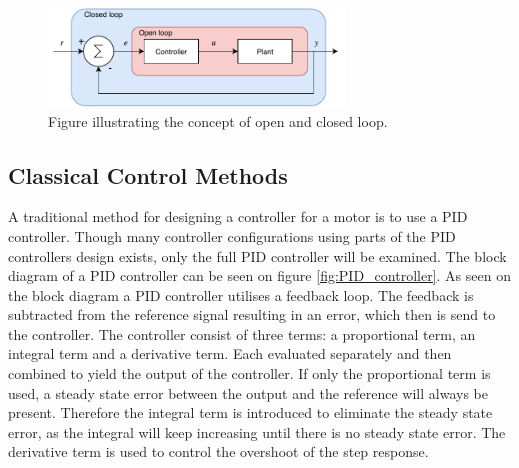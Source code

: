 \documentclass[../../main.tex]{subfiles}
\begin{document}

\begin{figure}[H]
    \centering
    \includegraphics[width=0.7\textwidth]{Sections/Miscellaneous/Images/Open_closed_Diagram.pdf}
    \caption{Figure illustrating the concept of open and closed loop. }
    \label{fig:Open_Close_loop}
\end{figure}





\subsection*{Classical Control Methods}


A traditional method for designing a controller for a motor is to use a PID controller. Though many controller configurations using parts of the PID controllers design exists, only the full PID controller will be examined. The block diagram of a PID controller can be seen on figure \ref{fig:PID_controller}. As seen on the block diagram
a PID controller utilises a feedback loop. The feedback is subtracted from the reference signal resulting in an error, which then is send to the controller. The controller consist of three terms: a proportional term, an integral term and a derivative term. Each evaluated separately and then combined to yield the output of the controller. If only the proportional term is used, a steady state error between the output and the reference will always be present. Therefore the integral term is introduced to eliminate the steady state error, as the integral will keep increasing until there is no steady state error. The derivative term is used to control the overshoot of the step response.
\end{document}
